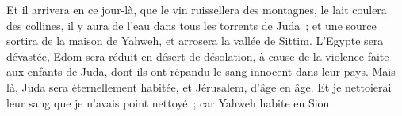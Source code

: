 \begin{multicols}{2}
Et il arrivera en ce jour-là, que le vin ruissellera des montagnes, le lait coulera des collines, il y aura de l'eau dans tous les torrents de Juda~; et une source sortira de la maison de Yahweh, et arrosera la vallée de Sittim.
L'Egypte sera dévastée, Edom sera réduit en désert de désolation, à cause de la violence faite aux enfants de Juda, dont ils ont répandu le sang innocent dans leur pays.
Mais là, Juda sera éternellement habitée, et Jérusalem, d'âge en âge.
Et je nettoierai leur sang que je n'avais point nettoyé~; car Yahweh habite en Sion.
\PPE{}
\end{multicols}
